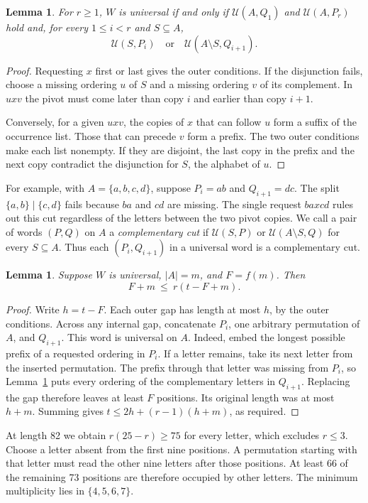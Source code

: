 \documentclass[11pt]{article}
\newtheorem{lemma}[theorem]{Lemma}
\newcommand{\cov}{\mathcal U}
\begin{document}
\begin{lemma}\label{lem:cut}
For $r\ge1$, $W$ is universal if and only if $\cov(A,Q_1)$ and $\cov(A,P_r)$ hold and, for every $1\le i<r$ and $S\subseteq A$,
\[
                 \cov(S,P_i)\quad\text{or}\quad \cov(A\setminus S,Q_{i+1}).
\]
\end{lemma}
\begin{proof}
Requesting $x$ first or last gives the outer conditions. If the disjunction fails, choose a missing ordering $u$ of $S$ and a missing ordering $v$ of its complement. In $uxv$ the pivot must come later than copy $i$ and earlier than copy $i+1$.

Conversely, for a given $uxv$, the copies of $x$ that can follow $u$ form a suffix of the occurrence list. Those that can precede $v$ form a prefix. The two outer conditions make each list nonempty. If they are disjoint, the last copy in the prefix and the next copy contradict the disjunction for $S$, the alphabet of $u$.
\end{proof}
For example, with $A=\{a,b,c,d\}$, suppose $P_i=ab$ and $Q_{i+1}=dc$. The split $\{a,b\}\mid\{c,d\}$ fails because $ba$ and $cd$ are missing. The single request $baxcd$ rules out this cut regardless of the letters between the two pivot copies. We call a pair of words $(P,Q)$ on $A$ a \emph{complementary cut} if $\cov(S,P)$ or $\cov(A\setminus S,Q)$ for every $S\subseteq A$. Thus each $(P_i,Q_{i+1})$ in a universal word is a complementary cut.

\begin{lemma}\label{lem:gap}
Suppose $W$ is universal, $|A|=m$, and $F=f(m)$. Then
\[
                    F+m\ \le\ r(t-F+m).
\]
\end{lemma}
\begin{proof}
Write $h=t-F$. Each outer gap has length at most $h$, by the outer conditions. Across any internal gap, concatenate $P_i$, one arbitrary permutation of $A$, and $Q_{i+1}$. This word is universal on $A$. Indeed, embed the longest possible prefix of a requested ordering in $P_i$. If a letter remains, take its next letter from the inserted permutation. The prefix through that letter was missing from $P_i$, so Lemma~\ref{lem:cut} puts every ordering of the complementary letters in $Q_{i+1}$. Replacing the gap therefore leaves at least $F$ positions. Its original length was at most $h+m$. Summing gives $t\le 2h+(r-1)(h+m)$, as required.
\end{proof}
At length 82 we obtain $r(25-r)\ge75$ for every letter, which excludes $r\le3$. Choose a letter absent from the first nine positions. A permutation starting with that letter must read the other nine letters after those positions. At least 66 of the remaining 73 positions are therefore occupied by other letters. The minimum multiplicity lies in $\{4,5,6,7\}$.
\end{document}
